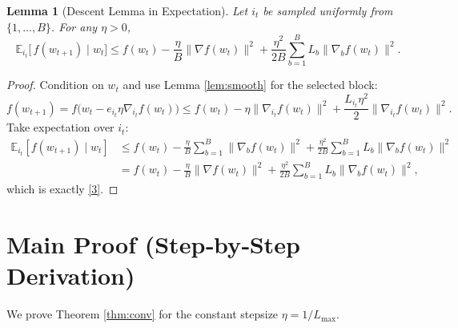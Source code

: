 \documentclass{article}
\newtheorem{lemma}{Lemma}
\newcommand{\E}{\mathbb{E}}
\begin{document}
\begin{lemma}[Descent Lemma in Expectation]\label{lem:expdescent}
Let $i_{t}$ be sampled uniformly from $\{1,\dots ,B\}$.  For any $\eta>0$,
\[
\E_{i_{t}}\!\Big[\,f(w_{t+1})\mid w_{t}\Big]
\le f(w_{t})-\frac{\eta}{B}\|\nabla f(w_{t})\|^{2}
+\frac{\eta^{2}}{2B}\sum_{b=1}^{B}L_{b}\|\nabla_{b}f(w_{t})\|^{2}.
\tag{3}
\]
\end{lemma}
\begin{proof}
Condition on $w_{t}$ and use Lemma \ref{lem:smooth} for the selected block:
\[
f(w_{t+1})=f\!\big(w_{t}-e_{i_{t}}\eta\nabla_{i_{t}}f(w_{t})\big)
\le f(w_{t})-\eta\|\nabla_{i_{t}}f(w_{t})\|^{2}
     +\frac{L_{i_{t}}\eta^{2}}{2}\|\nabla_{i_{t}}f(w_{t})\|^{2}.
\]
Take expectation over $i_{t}$:
\[
\begin{aligned}
\E_{i_{t}}[f(w_{t+1})\mid w_{t}]
&\le f(w_{t})-\frac{\eta}{B}\sum_{b=1}^{B}\|\nabla_{b}f(w_{t})\|^{2}
   +\frac{\eta^{2}}{2B}\sum_{b=1}^{B}L_{b}\|\nabla_{b}f(w_{t})\|^{2}\\
&= f(w_{t})-\frac{\eta}{B}\|\nabla f(w_{t})\|^{2}
   +\frac{\eta^{2}}{2B}\sum_{b=1}^{B}L_{b}\|\nabla_{b}f(w_{t})\|^{2},
\end{aligned}
\]
which is exactly \eqref{3}.
\end{proof}

\section*{Main Proof (Step‑by‑Step Derivation)}
We prove Theorem \ref{thm:conv} for the constant stepsize
$\eta=1/L_{\max}$.
\end{document}
